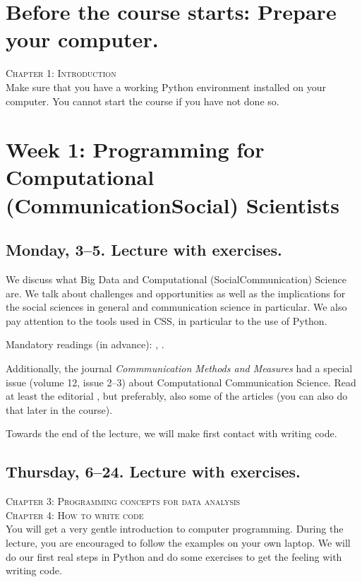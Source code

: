 
\section*{Before the course starts: Prepare your computer.}
\textsc{ Chapter 1: Introduction}\\
Make sure that you have a working Python environment installed on your computer. You cannot start the course if you have not done so.

\section*{Week 1: Programming for Computational (Communication\textbar Social) Scientists}
\subsection*{Monday, 3--5. Lecture with exercises.}
We discuss what Big Data and Computational (Social\textbar Communication) Science are. We talk about challenges and opportunities as well as the implications for the social sciences in general and communication science in particular. We also pay attention to the tools used in CSS, in particular to the use of Python.

Mandatory readings (in advance):  \cite{Kitchin2014}, \cite{Hilbert2019}.

Additionally, the journal \textit{Commmunication Methods and Measures} had a special issue (volume 12, issue 2--3) about Computational Communication Science. Read at least the editorial \citep{VanAtteveldt2018a}, but preferably, also some of the articles (you can also do that later in the course).

Towards the end of the lecture, we will make first contact with writing code.

\subsection*{Thursday, 6--24. Lecture with exercises.}
\textsc{ Chapter 3: Programming concepts for data analysis}\\
\textsc{ Chapter 4: How to write code}\\

You will get a very gentle introduction to computer programming. During the lecture, you are encouraged to follow the examples on your own laptop.
We will do our first real steps in Python and do some exercises to get the feeling with writing code.

